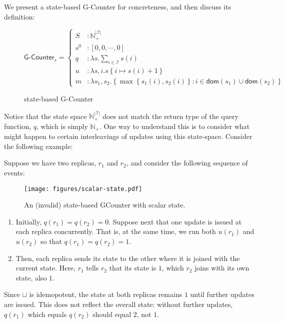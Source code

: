 We present a state-based G-Counter \CRDT for concreteness, and then discuss its
definition:

\begin{figure}[H]
  \centering
  \[
    \textsf{G-Counter}_s = \left\{\begin{aligned}
      S &: \mathbb{N}_+^{|\mathcal{I}|} \\
      s^0 &: \left[ 0, 0, \cdots, 0 \right] \\
      q &: \lambda s. \sum_{i \in \mathcal{I}} s(i) \\
      u &: \lambda s,i. s\left\{ i \mapsto s(i) + 1 \right\} \\
      m &: \lambda s_1, s_2. \left\{ \max\left\{ s_1(i), s_2(i) \right\}: i \in \mathsf{dom}(s_1) \cup
      \mathsf{dom}(s_2) \right\}
    \end{aligned}\right.
  \]
  \caption{state-based \textsf{G-Counter} \CRDT}
  \label{fig:state-gcounter}
\end{figure}

Notice that the state space $\mathbb{N}^{|\mathcal{I}|}_+$ does not match the
return type of the query function, $q$, which is simply $\mathbb{N}_+$. One way
to understand this is to consider what might happen to certain interleavings of
updates using this state-space. Consider the following example:

\begin{example}
  \label{example:vector-state-counter}
  Suppose we have two replicas, $r_1$ and $r_2$, and consider the following
  sequence of events:

  \begin{figure}[H]
    \centering
    \texttt{[image: figures/scalar-state.pdf]}
    \caption{An (invalid) state-based GCounter with scalar state.}
  \end{figure}

  \begin{enumerate}
    \item Initially, $q(r_1) = q(r_2) = 0$. Suppose next that one update is
      issued at each replica concurrently. That is, at the same time, we run
      both $u(r_1)$ and $u(r_2)$ so that $q(r_1) = q(r_2) = 1$.
    \item Then, each replica sends its state to the other where it is joined
      with the current state. Here, $r_1$ tells $r_2$ that its state is $1$,
      which $r_2$ joins with its own state, also $1$.
  \end{enumerate}

  Since $\sqcup$ is idemopotent, the state at both replicas remains $1$ until
  further updates are issued. This does not reflect the overall state: without
  further updates, $q(r_1)$ which equals $q(r_2)$ should equal $2$, not $1$.
\end{example}


